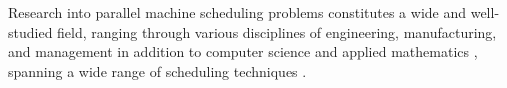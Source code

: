\documentclass{pbml}
\begin{document}
Research into parallel machine scheduling problems constitutes a wide and well-studied field, ranging through various disciplines of engineering, manufacturing, and management in addition to computer science and applied mathematics \citep{ChengSin90}, 
spanning a wide range of scheduling techniques \citep{PanwalkarIskander77}.


\end{document}
